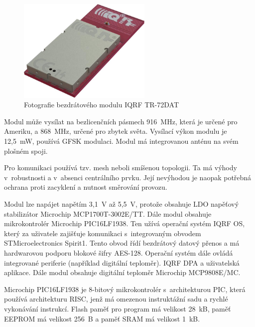 \documentclass[12pt,a4paper]{article}
\begin{document}
\begin{figure}[H]
\centering
\label{fig:iqrf/fotka}
\includegraphics[width = 64mm]{../img/iqrf/dctr-72dat.png}
\caption{Fotografie bezdrátového modulu IQRF TR-72DAT}
\end{figure}

Modul může vysílat na bezlicenčních pásmech 916~MHz, která je určené pro Ameriku, a 868~MHz, určené pro zbytek světa. Vysílací výkon modulu je 12,5~mW, používá GFSK modulaci. Modul má integrovanou anténu na svém plošném spoji.

Pro komunikaci používá tzv. mesh neboli smíšenou topologii. Ta má výhody v~robustnosti a v~absenci centrálního prvku. Její nevýhodou je naopak potřebná ochrana proti zacyklení a nutnost směrování provozu.

Modul lze napájet napětím 3,1~V až 5,5~V, protože obsahuje LDO napěťový stabilizátor Microchip MCP1700T-3002E/TT. Dále modul obsahuje mikrokontrolér Microchip PIC16LF1938. Ten užívá operační systém IQRF OS, který za uživatele zajišťuje komunikaci s~integrovaným obvodem STMicroelectronics Spirit1. Tento obvod řídí bezdrátový datový přenos a má hardwarovou podporu blokové šifry AES-128. Operační systém dále ovládá integrované periferie (například digitální teploměr). IQRF DPA a uživatelská aplikace. Dále modul obsahuje digitální teploměr Microchip MCP9808E/MC.

Microchip PIC16LF1938 je 8-bitový mikrokontrolér s~architekturou PIC, která používá architekturu RISC, jenž má omezenou instruktážní sadu a rychlé vykonávání instrukcí. Flash paměť pro program má velikost 28~kB, paměť EEPROM má velikost 256~B a paměť SRAM má velikost 1~kB.
\end{document}
